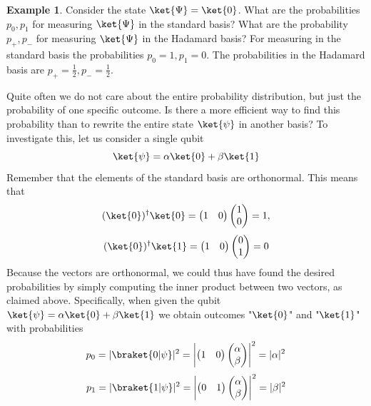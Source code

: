 \documentclass[12pt, oneside]{book}
\theoremstyle{definition}
\theoremstyle{definition}
\newtheorem{example}{Example}[section]
\theoremstyle{remark}
\begin{document}
\begin{example}
    Consider the state $\ket{\Psi}=\ket{0}$. What are the probabilities  $p_0,p_1$ for measuring $\ket{\Psi}$ in the standard basis? What are the probability $p_{+},p_{-}$ for measuring $\ket{\Psi}$ in the Hadamard basis?
    For measuring in the standard basis the probabilities $p_0=1, p_1=0$. The probabilities in the Hadamard basis are $p_+=\frac{1}{2},p_-=\frac{1}{2}$.
\end{example}

Quite often we do not care about the entire probability distribution, but just the probability of one
specific outcome. Is there a more efficient way to find this probability than to rewrite the entire
state $\ket{\psi}$ in another basis? To investigate this, let us consider a single qubit
\[
\ket{\psi}=\alpha\ket{0}+\beta\ket{1}
\]
Remember that the elements of the standard basis are orthonormal. This means that
\[
(\ket{0})^{\dagger}\ket{0}=\begin{pmatrix} 1 & 0 \end{pmatrix}\begin{pmatrix} 1 \\ 0 \end{pmatrix} = 1,
\]
\[
(\ket{0})^{\dagger}\ket{1}=\begin{pmatrix} 1 & 0 \end{pmatrix}\begin{pmatrix} 0 \\ 1 \end{pmatrix} = 0
\]
Because the vectors are orthonormal, we could thus have found the desired probabilities by simply
computing the inner product between two vectors, as claimed above. Specifically, when given the qubit $\ket{\psi}=\alpha\ket{0}+\beta\ket{1}$ we obtain outcomes "$\ket{0}$" and "$\ket{1}$" with probabilities
\[
p_0=|\braket{0|\psi}|^2=\begin{vmatrix}\begin{pmatrix} 1 & 0 \end{pmatrix} \begin{pmatrix}\alpha \\ \beta \end{pmatrix}  \end{vmatrix}^2=|\alpha|^2
\]
\[
p_1=|\braket{1|\psi}|^2=\begin{vmatrix} \begin{pmatrix} 0 & 1 \end{pmatrix}\begin{pmatrix}\alpha \\ \beta \end{pmatrix}  \end{vmatrix}^2=|\beta|^2
\]
\end{document}
